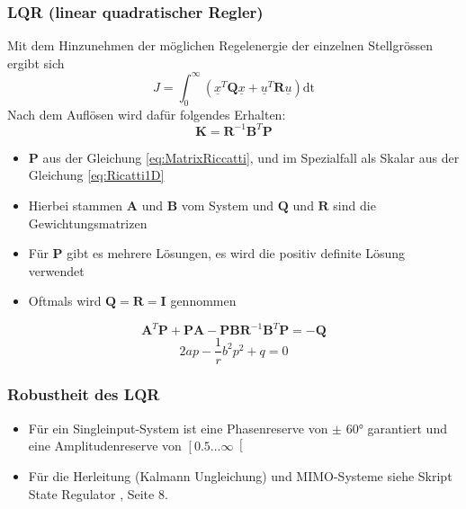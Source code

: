 \subsubsection{LQR (linear quadratischer Regler)}
\label{subsubsec:LQR}
Mit dem Hinzunehmen der möglichen Regelenergie der einzelnen Stellgrössen ergibt sich
\begin{equation*}
	J = \int_{0}^{\infty}\left(\underline{x}^T\boldsymbol{Q} \underline{x} + \underline{u}^T \boldsymbol{R} \underline{u}\right)\text{dt}
\end{equation*}
Nach dem Auflösen wird dafür folgendes Erhalten:
\begin{equation*}
	\boldsymbol{K} = \boldsymbol{R}^{-1}\boldsymbol{B}^T\boldsymbol{P}
\end{equation*}
\begin{itemize}
	\item  $\boldsymbol{P}$ aus der Gleichung \ref{eq:MatrixRiccatti}, und im Spezialfall als Skalar aus der Gleichung \ref{eq:Ricatti1D}
	\item Hierbei stammen $\boldsymbol{A}$ und $\boldsymbol{B}$ vom System und $\boldsymbol{Q}$ und $\boldsymbol{R}$ sind die Gewichtungsmatrizen
	\item Für $\boldsymbol{P}$ gibt es mehrere Lösungen, es wird die positiv definite Lösung verwendet
	\item Oftmals wird $\boldsymbol{Q} = \boldsymbol{R} = \boldsymbol{I}$ gennommen
\end{itemize}
\begin{equation}
	\label{eq:MatrixRiccatti}
	\boldsymbol{A}^T\boldsymbol{P}+\boldsymbol{PA}-\boldsymbol{PBR}^{-1}\boldsymbol{B}^T\boldsymbol{P} = -\boldsymbol{Q}
\end{equation}
\begin{equation}
	\label{eq:Ricatti1D}
	2ap-\frac{1}{r}b^2p^2+q = 0
\end{equation}

\subsubsection{Robustheit des LQR}
\begin{itemize}
	\item Für ein Singleinput-System ist eine Phasenreserve von $\pm$ \ang{60} garantiert und eine Amplitudenreserve von $\left[\right.0.5\ldots\infty\left.\right[$
	\item Für die Herleitung (Kalmann Ungleichung) und MIMO-Systeme siehe Skript \glqq State Regulator \grqq, Seite 8. 
\end{itemize}

